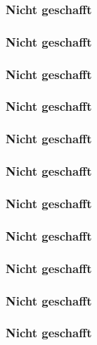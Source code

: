 \begin{frame}
 \frametitle{Nicht geschafft}
\end{frame}


\begin{frame}
 \frametitle{Nicht geschafft}
\end{frame}


\begin{frame}
 \frametitle{Nicht geschafft}
\end{frame}


\begin{frame}
 \frametitle{Nicht geschafft}
\end{frame}


\begin{frame}
 \frametitle{Nicht geschafft}
\end{frame}


\begin{frame}
 \frametitle{Nicht geschafft}
\end{frame}


\begin{frame}
 \frametitle{Nicht geschafft}
\end{frame}


\begin{frame}
 \frametitle{Nicht geschafft}
\end{frame}


\begin{frame}
 \frametitle{Nicht geschafft}
\end{frame}


\begin{frame}
 \frametitle{Nicht geschafft}
\end{frame}


\begin{frame}
 \frametitle{Nicht geschafft}
\end{frame}


